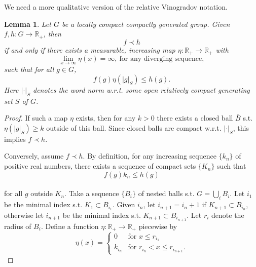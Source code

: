 \documentclass[12pt]{amsart}
\newtheorem{lemma}[theorem]{Lemma}
\theoremstyle{definition}
\begin{document}
We need a more qualitative version of the relative Vinogradov notation.


\begin{lemma}
\label{87d5ac}
Let \(G\) be a locally compact compactly generated group. Given
\(f, h: G \rightarrow \mathbb{R}_{+}\), then \[f \prec h\] if and only
if there exists a measurable, increasing map
\(\eta: \mathbb{R}_{+} \to \mathbb{R}_{+}\) with
\[\lim_{ x \to \infty } \eta(x) = \infty, \:\text{for any diverging sequence},\]
such that for all \(g \in G\), \[f(g)\eta(|g|_{S}) \leq h(g).\] Here
\(|\cdot|_{S}\) denotes the word norm w.r.t. some open relatively
compact generating set \(S\) of \(G\).
\end{lemma}

\begin{proof}
If such a map \(\eta\) exists, then for any \(k > 0\) there exists a
closed ball \(\bar{B}\) s.t. \(\eta(|g|_{S}) \geq k\) outside of this
ball. Since closed balls are compact w.r.t. \(|\cdot|_{S}\), this
implies \(f \prec h\).

Conversely, assume \(f \prec h\). By definition, for any increasing
sequence \(\{k_n\}\) of positive real numbers, there exists a sequence
of compact sets \(\{K_n\}\) such that \[
f(g) k_n \leq h(g)
\]\\
for all \(g\) outside \(K_n\). Take a sequence \(\{ B_{i} \}\) of nested
balls s.t. \(G = \bigcup_{i}B_{i}\). Let \(i_{1}\) be the minimal index
s.t. \(K_{1} \subset B_{i_{1}}\). Given \(i_{n}\), let
\(i_{n+1} = i_{n} + 1\) if \(K_{n+1} \subset B_{i_{n}}\), otherwise let
\(i_{n+1}\) be the minimal index s.t. \(K_{n+1} \subset B_{i_{n+1}}\).
Let \(r_{i}\) denote the radius of \(B_{i}\). Define a function
\(\eta: \mathbb{R}_{+} \to \mathbb{R}_{+}\) piecewise by\\
\[\eta(x) = \begin{cases}
0 & \text{for } x \leq r_{i_{1}}\\
k_{i_{n}} & \text{for } r_{i_{n}} < x \leq r_{i_{n+1}}.
\end{cases}\]

\end{proof}
\end{document}
